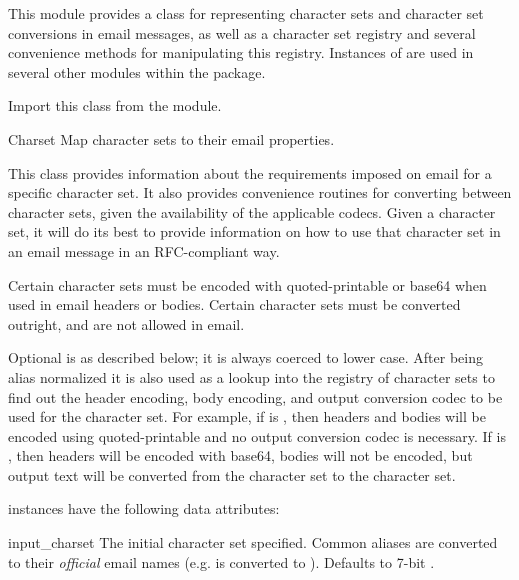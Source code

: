 
This module provides a class  for representing
character sets and character set conversions in email messages, as
well as a character set registry and several convenience methods for
manipulating this registry.  Instances of  are used in
several other modules within the  package.

Import this class from the  module.


\begin{classdesc}{Charset}{}
Map character sets to their email properties.

This class provides information about the requirements imposed on
email for a specific character set.  It also provides convenience
routines for converting between character sets, given the availability
of the applicable codecs.  Given a character set, it will do its best
to provide information on how to use that character set in an email
message in an RFC-compliant way.

Certain character sets must be encoded with quoted-printable or base64
when used in email headers or bodies.  Certain character sets must be
converted outright, and are not allowed in email.

Optional  is as described below; it is always
coerced to lower case.  After being alias normalized it is also used
as a lookup into the registry of character sets to find out the header
encoding, body encoding, and output conversion codec to be used for
the character set.  For example, if
 is , then headers and bodies will
be encoded using quoted-printable and no output conversion codec is
necessary.  If  is , then headers will
be encoded with base64, bodies will not be encoded, but output text
will be converted from the  character set to the
 character set.
\end{classdesc}

 instances have the following data attributes:

\begin{datadesc}{input_charset}
The initial character set specified.  Common aliases are converted to
their \emph{official} email names (e.g.  is converted to
).  Defaults to 7-bit .
\end{datadesc}

